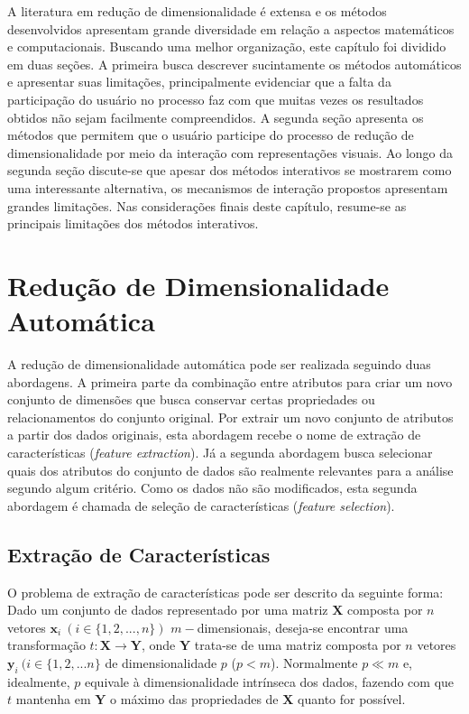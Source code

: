 A literatura em redução de dimensionalidade é extensa e os métodos desenvolvidos apresentam grande diversidade em relação a aspectos matemáticos e computacionais. 
Buscando uma melhor organização, este capítulo foi dividido em duas seções. 
A primeira busca descrever sucintamente os métodos automáticos e apresentar suas limitações, principalmente evidenciar que a falta da participação do usuário no processo faz com que muitas vezes os resultados obtidos não sejam facilmente compreendidos. 
A segunda seção apresenta os métodos que permitem que o usuário participe do processo de redução de dimensionalidade por meio da interação com representações visuais. 
Ao longo da segunda seção discute-se que apesar dos métodos interativos se mostrarem como uma interessante alternativa, os mecanismos de interação propostos apresentam grandes limitações. 
Nas considerações finais deste capítulo, resume-se as principais limitações dos métodos interativos. 

\section{Redução de Dimensionalidade Automática}

A redução de dimensionalidade automática pode ser realizada seguindo duas abordagens. 
A primeira parte da combinação entre atributos para criar um novo conjunto de dimensões que busca conservar certas propriedades ou relacionamentos do conjunto original. 
Por extrair um novo conjunto de atributos a partir dos dados originais, esta abordagem recebe o nome de extração de características (\emph{feature extraction}).
Já a segunda abordagem busca selecionar quais dos atributos do conjunto de dados são realmente relevantes para a análise segundo algum critério. 
Como os dados não são modificados, esta segunda abordagem é chamada de seleção de características (\emph{feature selection}).

\subsection{Extração de Características}

O problema de extração de características pode ser descrito da seguinte forma: 
Dado um conjunto de dados representado por uma matriz $\textbf{X}$ composta por $n$ vetores $\textbf{x}_i~(i \in \{1,2,...,n\})$ $m-$dimensionais, deseja-se encontrar uma transformação $t: \textbf{X} \rightarrow \textbf{Y}$, onde $\textbf{Y}$ trata-se de uma matriz composta por $n$ vetores $\textbf{y}_i~(i \in \{1,2,...n\}$ de dimensionalidade $p$ ($p < m$). 
Normalmente $p \ll m$ e, idealmente, $p$ equivale à dimensionalidade intrínseca dos dados, fazendo com que $t$ mantenha em $\textbf{Y}$ o máximo das propriedades de $\textbf{X}$ quanto for possível. 

